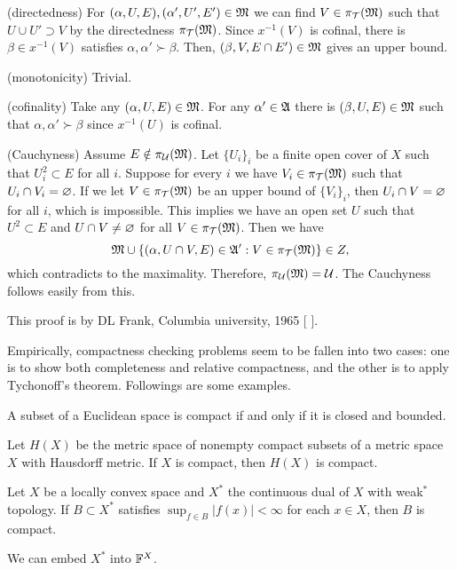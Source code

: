 \documentclass{../exp}
\begin{document}
\begin{pf}[1]
(directedness)
For $(\alpha,U,E),(\alpha',U',E')\in\mathfrak{M}$ we can find $V\in\pi_{\mathcal{T}}(\mathfrak{M})$ such that $U\cup U'\supset V$ by the directedness $\pi_{\mathcal{T}}(\mathfrak{M})$.
Since $x^{-1}(V)$ is cofinal, there is $\beta\in x^{-1}(V)$ satisfies $\alpha,\alpha'\succ\beta$.
Then, $(\beta,V,E\cap E')\in\mathfrak{M}$ gives an upper bound.

(monotonicity) Trivial.

(cofinality)
Take any $(\alpha,U,E)\in\mathfrak{M}$.
For any $\alpha'\in\mathfrak{A}$ there is $(\beta,U,E)\in\mathfrak{M}$ such that $\alpha,\alpha'\succ\beta$ since $x^{-1}(U)$ is cofinal.

(Cauchyness)
Assume $E\notin\pi_{\mathcal{U}}(\mathfrak{M})$.
Let $\{U_i\}_i$ be a finite open cover of $X$ such that $U_i^2\subset E$ for all $i$.
Suppose for every $i$ we have $V_i\in\pi_{\mathcal{T}}(\mathfrak{M})$ such that $U_i\cap V_i=\varnothing$.
If we let $V\in\pi_{\mathcal{T}}(\mathfrak{M})$ be an upper bound of $\{V_i\}_i$, then $U_i\cap V=\varnothing$ for all $i$, which is impossible.
This implies we have an open set $U$ such that $U^2\subset E$ and $U\cap V\ne\varnothing$ for all $V\in\pi_{\mathcal{T}}(\mathfrak{M})$.
Then we have
\[\mathfrak{M}\cup\{(\alpha,U\cap V,E)\in\mathfrak{A}':V\in\pi_{\mathcal{T}}(\mathfrak{M})\}\in Z,\]
which contradicts to the maximality.
Therefore, $\pi_{\mathcal{U}}(\mathfrak{M})=\mathcal{U}$.
The Cauchyness follows easily from this.
\end{pf}
\begin{pf}[2]
This proof is by DL Frank, Columbia university, 1965 [ ].

\end{pf}


Empirically, compactness checking problems seem to be fallen into two cases: one is to show both completeness and relative compactness, and the other is to apply Tychonoff's theorem.
Followings are some examples.

\begin{ex}
A subset of a Euclidean space is compact if and only if it is closed and bounded.
\end{ex}
\begin{ex}
Let $H(X)$ be the metric space of nonempty compact subsets of a metric space $X$ with Hausdorff metric.
If $X$ is compact, then $H(X)$ is compact.
\end{ex}
\begin{ex}
Let $X$ be a locally convex space and $X^*$ the continuous dual of $X$ with weak$^*$ topology.
If $B\subset X^*$ satisfies $\sup_{f\in B}|f(x)|<\infty$ for each $x\in X$, then $B$ is compact.
\end{ex}
\begin{pf}
We can embed $X^*$ into $\mathbb{F}^X$.
\end{pf}
\end{document}
